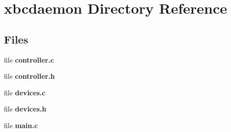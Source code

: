 \section{xbcdaemon Directory Reference}
\label{dir_a800f33849af0f045003dbf1ac602e4d}
\subsection*{Files}
\begin{DoxyCompactItemize}
\item 
file {\bfseries controller.\-c}
\item 
file {\bfseries controller.\-h}
\item 
file {\bfseries devices.\-c}
\item 
file {\bfseries devices.\-h}
\item 
file {\bfseries main.\-c}
\end{DoxyCompactItemize}
